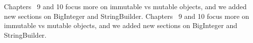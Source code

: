 Chapters ~9 and 10 focus more on immutable vs mutable objects, and we added new sections on BigInteger and StringBuilder.
Chapters~ 9 and 10 focus more on immutable vs mutable objects, and we added new sections on BigInteger and StringBuilder.
